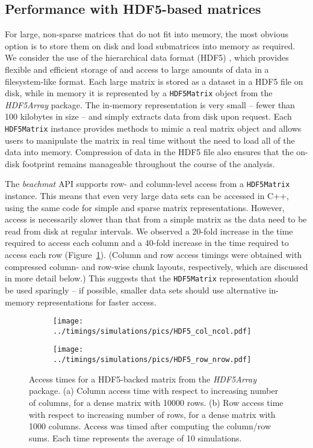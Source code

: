 \documentclass[10pt,letterpaper]{article}
\newcommand{\beachmat}{\textit{beachmat}}
\newcommand{\code}[1]{\texttt{#1}}
\begin{document}
\subsection*{Performance with HDF5-based matrices}
For large, non-sparse matrices that do not fit into memory, the most obvious option is to store them on disk and load submatrices into memory as required.
We consider the use of the hierarchical data format (HDF5) \cite{hdf5}, which provides flexible and efficient storage of and access to large amounts of data in a filesystem-like format.
Each large matrix is stored as a dataset in a HDF5 file on disk, while in memory it is represented by a \code{HDF5Matrix} object from the \textit{HDF5Array} package.
The in-memory representation is very small -- fewer than 100 kilobytes in size -- and simply extracts data from disk upon request.
Each \code{HDF5Matrix} instance provides methods to mimic a real matrix object and allows users to manipulate the matrix in real time without the need to load all of the data into memory.
Compression of data in the HDF5 file also ensures that the on-disk footprint remains manageable throughout the course of the analysis.

The \beachmat{} API supports row- and column-level access from a \code{HDF5Matrix} instance.
This means that even very large data sets can be accessed in C++, using the same code for simple and sparse matrix representations.
However, access is necessarily slower than that from a simple matrix as the data need to be read from disk at regular intervals.
We observed a 20-fold increase in the time required to access each column and a 40-fold increase in the time required to access each row (Figure~\ref{fig:hdf5time}).
(Column and row access timings were obtained with compressed column- and row-wise chunk layouts, respectively, which are discussed in more detail below.)
This suggests that the \code{HDF5Matrix} representation should be used sparingly -- if possible, smaller data sets should use alternative in-memory representations for faster access.

\begin{figure}[bt]
    \begin{subfigure}[b]{0.49\textwidth}
        \texttt{[image: ../timings/simulations/pics/HDF5\_col\_ncol.pdf]}
        \caption{}
    \end{subfigure}
    \begin{subfigure}[b]{0.49\textwidth}
        \texttt{[image: ../timings/simulations/pics/HDF5\_row\_nrow.pdf]}
        \caption{}
    \end{subfigure}
    \caption{Access times for a HDF5-backed matrix from the \textit{HDF5Array} package.
        (a) Column access time with respect to increasing number of columns, for a dense matrix with 10000 rows.
        (b) Row access time with respect to increasing number of rows, for a dense matrix with 1000 columns.
        Access was timed after computing the column/row sums.
        Each time represents the average of 10 simulations.
    }
    \label{fig:hdf5time}
\end{figure}
\end{document}
